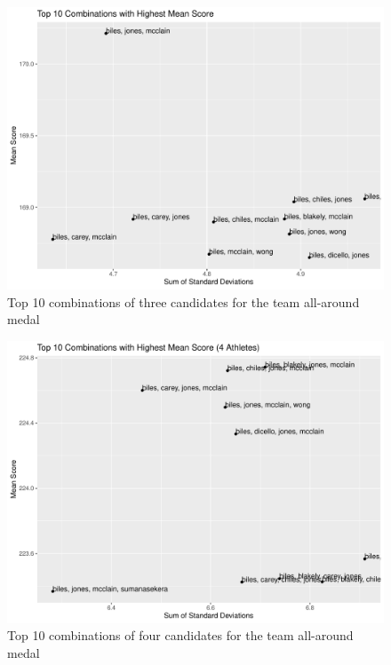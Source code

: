 \documentclass[12pt]{article}
\begin{document}
\begin{figure}[tbp]
  \centering
  \includegraphics[scale=0.6]{TeamCombinations3.pdf}
  \caption{Top 10 combinations of three candidates for the team all-around medal}
  \label{fig:AA3}
\end{figure}

\begin{figure}[tbp]
  \centering
  \includegraphics[scale=0.6]{TeamCombinations4.pdf}
  \caption{Top 10 combinations of four candidates for the team all-around medal}
  \label{fig:AA4}
\end{figure}





 
\end{document}
